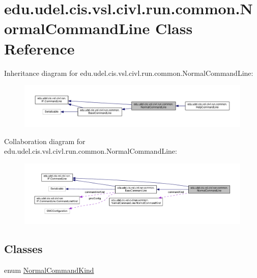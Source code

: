 \hypertarget{classedu_1_1udel_1_1cis_1_1vsl_1_1civl_1_1run_1_1common_1_1NormalCommandLine}{}\section{edu.\+udel.\+cis.\+vsl.\+civl.\+run.\+common.\+Normal\+Command\+Line Class Reference}
\label{classedu_1_1udel_1_1cis_1_1vsl_1_1civl_1_1run_1_1common_1_1NormalCommandLine}


Inheritance diagram for edu.\+udel.\+cis.\+vsl.\+civl.\+run.\+common.\+Normal\+Command\+Line\+:
\nopagebreak
\begin{figure}[H]
\begin{center}
\leavevmode
\includegraphics[width=350pt]{classedu_1_1udel_1_1cis_1_1vsl_1_1civl_1_1run_1_1common_1_1NormalCommandLine__inherit__graph}
\end{center}
\end{figure}


Collaboration diagram for edu.\+udel.\+cis.\+vsl.\+civl.\+run.\+common.\+Normal\+Command\+Line\+:
\nopagebreak
\begin{figure}[H]
\begin{center}
\leavevmode
\includegraphics[width=350pt]{classedu_1_1udel_1_1cis_1_1vsl_1_1civl_1_1run_1_1common_1_1NormalCommandLine__coll__graph}
\end{center}
\end{figure}
\subsection*{Classes}
\begin{DoxyCompactItemize}
\item 
enum \hyperlink{enumedu_1_1udel_1_1cis_1_1vsl_1_1civl_1_1run_1_1common_1_1NormalCommandLine_1_1NormalCommandKind}{Normal\+Command\+Kind}
\end{DoxyCompactItemize}
